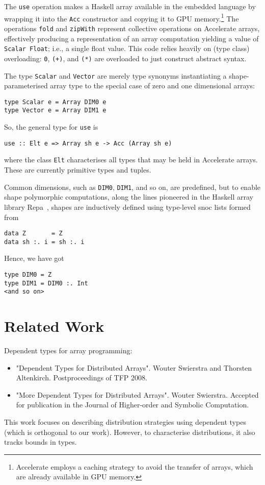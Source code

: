 \documentclass{llncs}
\begin{document}
The \verb+use+ operation makes a Haskell array available in the embedded language by wrapping it into the \verb+Acc+ constructor and copying it to GPU memory.\footnote{Accelerate employs a caching strategy to avoid the transfer of arrays, which are already available in GPU memory.} The operations \texttt{fold} and \texttt{zipWith} represent collective operations on Accelerate arrays, effectively producing a representation of an array computation yielding a value of
\texttt{Scalar Float}; i.e., a single float value. This code relies
heavily on (type class) overloading: \texttt{0}, \texttt{(+)}, and
\texttt{(*)} are overloaded to just construct abstract syntax. 

The type \verb+Scalar+ and \verb+Vector+ are merely type synonyms instantiating a shape-parameterised array type to the special case of zero and one dimensional arrays:
%
\begin{verbatim}
type Scalar e = Array DIM0 e
type Vector e = Array DIM1 e
\end{verbatim}
%
So, the general type for \verb+use+ is
%
\begin{verbatim}
use :: Elt e => Array sh e -> Acc (Array sh e)
\end{verbatim}
%
where the class \verb+Elt+ characterises all types that may be held in Accelerate arrays. These are currently primitive types and tuples.

Common dimensions, such as \verb+DIM0+, \verb+DIM1+, and so on, are predefined, but to enable shape polymorphic computations, along the lines pioneered in the Haskell array library Repa~\cite{keller-etal:repa}, shapes are inductively defined using type-level snoc lists formed from
%
\begin{verbatim}
data Z       = Z
data sh :. i = sh :. i
\end{verbatim}
%
Hence, we have got
%
\begin{verbatim}
type DIM0 = Z
type DIM1 = DIM0 :. Int
<and so on>
\end{verbatim}

\section{Related Work}
\label{sec:related-work}

Dependent types for array programming: 
\begin{itemize}
\item "Dependent Types for Distributed Arrays".
Wouter Swierstra and Thorsten Altenkirch. Postproceedings of TFP 2008.
\item "More Dependent Types for Distributed Arrays".
Wouter Swierstra. Accepted for publication in the Journal of Higher-order and Symbolic Computation.
\end{itemize}
This work focuses on describing distribution strategies using dependent types (which is orthogonal to our work). However, to characterise distributions, it also tracks bounds in types.
\end{document}
